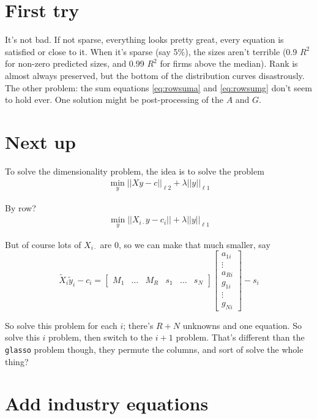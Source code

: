 \documentclass[11pt]{article}
\begin{document}
\section{First try}

It's not bad. If not sparse, everything looks pretty great, every equation is satisfied or close to it. When it's sparse (say 5\%), the sizes aren't terrible (0.9 $R^2$ for non-zero predicted sizes, and 0.99 $R^2$ for firms above the median). Rank is almost always preserved, but the bottom of the distribution curves disastrously. The other problem: the sum equations \eqref{eq:rowsuma} and \eqref{eq:rowsumg} don't seem to hold ever.  One solution might be post-processing of the $A$ and $G$.

\section{Next up}

To solve the dimensionality problem, the idea is to solve the problem
\begin{gather}
\min_y || X y - c||_{\ell 2} + \lambda || y ||_{\ell 1}
\end{gather}

By row?
\begin{gather}
\min_{y} || X_{i \cdot} y - c_i || + \lambda || y ||_{\ell 1} 
\end{gather}

But of course lots of $X_{i \cdot}$ are 0, so we can make that much smaller, say
\[
\tilde{X}_i \tilde{y}_i - c_i = 
\begin{bmatrix}
	M_1 & \dots & M_R & s_1 & \dots & s_N
\end{bmatrix}
\begin{bmatrix}
	a_{1i} \\
	\vdots \\
	a_{Ri} \\
	g_{1i} \\
	\vdots \\
	g_{Ni}
\end{bmatrix}
-
s_i
\]

So solve this problem for each $i$; there's $R+N$ unknowns and one equation. So solve this $i$ problem, then switch to the $i+1$ problem. That's different than the \texttt{glasso} problem though, they permute the columns, and sort of solve the whole thing?


\section{Add industry equations}
\end{document}
